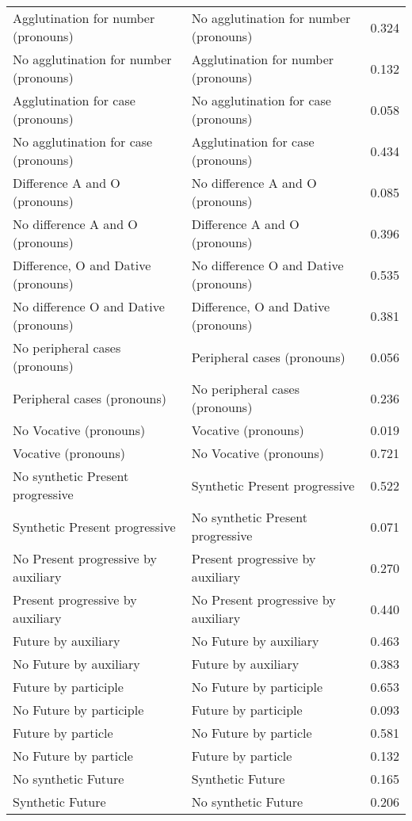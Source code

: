 \begin{longtable}{p{.4\linewidth}p{.4\linewidth}p{.1\linewidth}}
Agglutination for number (pronouns) & No agglutination for number (pronouns) & 0.324\\
No agglutination for number (pronouns) & Agglutination for number (pronouns) & 0.132\\
Agglutination for case (pronouns) & No agglutination for case (pronouns) & 0.058\\
No agglutination for case (pronouns) & Agglutination for case (pronouns) & 0.434\\
Difference A and O (pronouns) & No difference A and O (pronouns) & 0.085\\
No difference A and O (pronouns) & Difference A and O (pronouns) & 0.396\\
Difference, O and Dative (pronouns) & No difference O and Dative (pronouns) & 0.535\\
No difference O and Dative (pronouns) & Difference, O and Dative (pronouns) & 0.381\\
No peripheral cases (pronouns) & Peripheral cases (pronouns) & 0.056\\
Peripheral cases (pronouns) & No peripheral cases (pronouns) & 0.236\\
No Vocative (pronouns) & Vocative (pronouns) & 0.019\\
Vocative (pronouns) & No Vocative (pronouns) & 0.721\\
No synthetic Present progressive & Synthetic Present progressive & 0.522\\
Synthetic Present progressive & No synthetic Present progressive & 0.071\\
No Present progressive by auxiliary & Present progressive by auxiliary & 0.270\\
Present progressive by auxiliary & No Present progressive by auxiliary & 0.440\\
Future by auxiliary & No Future by auxiliary & 0.463\\
No Future by auxiliary & Future by auxiliary & 0.383\\
Future by participle & No Future by participle & 0.653\\
No Future by participle & Future by participle & 0.093\\
Future by particle & No Future by particle & 0.581\\
No Future by particle & Future by particle & 0.132\\
No synthetic Future & Synthetic Future & 0.165\\
Synthetic Future & No synthetic Future & 0.206\\

\end{longtable}
